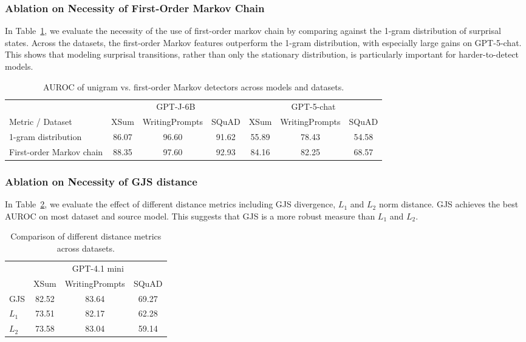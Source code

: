 \documentclass{article}
\theoremstyle{plain}
\theoremstyle{definition}
\theoremstyle{remark}
\begin{document}
\subsubsection{\quad Ablation on Necessity of First-Order Markov Chain} \label{sec:ablation-fo-markov}

In Table~\ref{tab:unigram-markov-comparison}, we evaluate the necessity of the use of first-order markov chain by comparing against the 1-gram distribution of surprisal states. Across the datasets, the first-order Markov features outperform the 1-gram distribution, with especially large gains on GPT-5-chat. This shows that modeling surprisal transitions, rather than only the stationary distribution, is particularly important for harder-to-detect models.
\begin{table}[htbp]
\centering
{\scriptsize
\begin{tabular}{l cccccc}
\toprule
                          & \multicolumn{3}{c}{GPT-J-6B}      & \multicolumn{3}{c}{GPT-5-chat} \\
Metric / Dataset          & XSum        & WritingPrompts & SQuAD    & XSum        & WritingPrompts & SQuAD    \\
\midrule
1-gram distribution       & 86.07       & 96.60          & 91.62    & 55.89       & 78.43          & 54.58    \\
First-order Markov chain  & 88.35       & 97.60          & 92.93    & 84.16       & 82.25          & 68.57    \\
\bottomrule
\end{tabular}}
\caption{AUROC of unigram vs. first-order Markov detectors across models and datasets.}
\label{tab:unigram-markov-comparison}
\end{table}


\subsubsection{\quad Ablation on Necessity of GJS distance} \label{sec:ablation-GJS-l1-l2}

In Table~\ref{tab:metric-model-dataset}, we evaluate the effect of different distance metrics including GJS divergence, $L_1$ and $L_2$ norm distance. GJS achieves the best AUROC on most dataset and source model. This suggests that GJS is a more robust measure than $L_1$ and $L_2$.

\begin{table}[htbp]
    \centering
    {\small
    \begin{tabular}{l c c c}
\toprule
                     & \multicolumn{3}{c}{GPT-4.1 mini} \\
          & XSum        & WritingPrompts & SQuAD      \\
\midrule
GJS                & 82.52       & 83.64          & 69.27      \\
$L_1$              & 73.51       & 82.17          & 62.28      \\
$L_2$              & 73.58       & 83.04          & 59.14      \\
\bottomrule
\end{tabular}
\caption{Comparison of different distance metrics across datasets.}
\label{tab:metric-model-dataset}}
\end{table}
\end{document}
